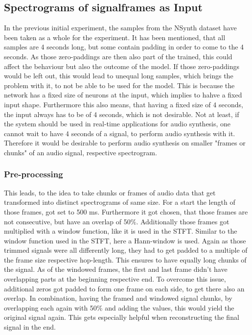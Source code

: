 \subsection{Spectrograms of signalframes as Input}
In the previous initial experiment, the samples from the NSynth dataset have been taken as a whole for the experiment. It has been mentioned, that all samples are 4 seconds long, but some contain padding in order to come to the 4 seconds. As those zero-paddings are then also part of the trained, this could affect the behaviour but also the outcome of the model. If those zero-paddings would be left out, this would lead to unequal long samples, which brings the problem with it, to not be able to be used for the model. This is because the network has a fixed size of neurons at the input, which implies to hahve a fixed input shape. Furthermore this also means, that having a fixed size of 4 seconds, the input always has to be of 4 seconds, which is not desirable. Not at least, if the system should be used in real-time applications for audio synthesis, one cannot wait to have 4 seconds of a signal, to perform audio synthesis with it. Therefore it would be desirable to perform audio synthesis on smaller "frames or chunks" of an audio signal, respective spectrogram. 

\subsubsection{Pre-processing}
This leads, to the idea to take chunks or frames of audio data that get transformed into distinct spectrograms of same size. For a start the length of those frames, got set to 500 ms. Furthermore it got chosen, that those frames are not consecutive, but have an overlap of 50\%. Additionally those frames got multiplied with a window function, like it is used in the STFT. Similar to the window function used in the STFT, here a Hann-window is used. Again as those trimmed signals were all differently long, they had to get padded to a multiple of the frame size respective hop-length. This ensures to have equally long chunks of the signal. As of the windowed frames, the first and last frame didn't have overlapping parts at the beginning respective end. To overcome this issue, additional zeros got padded to form one frame on each side, to get there also an overlap. In combination, having the framed and windowed signal chunks, by overlapping each again with 50\% and adding the values, this would yield the original signal again. This gets especially helpful when reconstructing the final signal in the end. 

